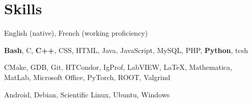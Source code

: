 \section{Skills}
\begin{description}[leftmargin=12pt,font=\normalfont\textit]
\item[Languages:] English (native), French (working proficiency)
\item[Programming Languages:] \textbf{Bash}, C, \textbf{C++}, CSS, HTML, Java, JavaScript, MySQL, PHP, \textbf{Python}, tcsh
\item[Software:] CMake, GDB, Git, HTCondor, IgProf, LabVIEW, \LaTeX, Mathematica, MatLab, Microsoft Office, PyTorch, ROOT, Valgrind
\item[Operating Systems:] Android, Debian, Scientific Linux, Ubuntu, Windows
\end{description}